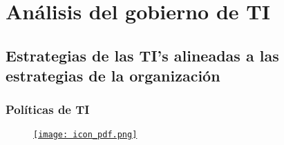\section{Análisis del gobierno de TI}


\subsection{Estrategias de las TI's alineadas a las estrategias de la organización}

\subsubsection{Políticas de TI}
    \begin{figure}[!ht]
        \centering
        \href{https://klintex.com.pe/wp-content/uploads/2021/12/Politica-Privacidad_-Klintex.pdf}{
                \texttt{[image: icon\_pdf.png]}
                }
    \end{figure}  

